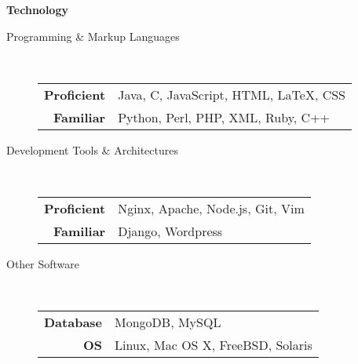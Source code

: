\documentclass[10pt,letterpaper]{article}
\newenvironment{topic}[1]{
\begin{minipage}[t]{0.12\linewidth}\begin{flushleft}\begin{flushright}\textbf{#1}\end{flushright}\end{flushleft}\end{minipage}\hspace{4mm}\vrule\hspace{4mm}\begin{minipage}[t]{0.82\linewidth}\begin{flushright}\begin{flushleft}
}{
\end{flushleft}\end{flushright}\end{minipage}\vspace{12mm}
}
\begin{document}
\begin{topic}{Technology}
  \begin{description}
    \item[Programming \& Markup Languages] \hfill \\
    \vspace{1em}
    \begin{tabular}{r    l}
      \vspace{1em}
      \textbf{Proficient} & Java, C, JavaScript, HTML, \LaTeX, CSS \\
      \textbf{Familiar} & Python, Perl, PHP, XML, Ruby, C++
    \end{tabular}
    \item[Development Tools \& Architectures] \hfill \\
    \vspace{1em}
    \begin{tabular}{r    l}
      \vspace{1em}
      \textbf{Proficient} & Nginx, Apache, Node.js, Git, Vim \\
      \textbf{Familiar} & Django, Wordpress
    \end{tabular}

    \item[Other Software] \hfill \\
    \vspace{1em}
    \begin{tabular}{r    l}
      \vspace{1em}
      \textbf{Database} & MongoDB, MySQL \\
      \textbf{OS} & Linux, Mac OS X, FreeBSD, Solaris
    \end{tabular}
  \end{description}
\end{topic}
\end{document}
